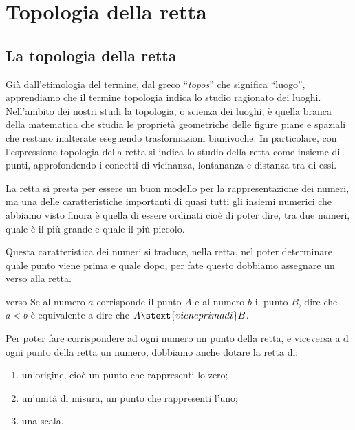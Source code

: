 


\chapter{Topologia della retta}

\section{La topologia della retta}
Già dall'etimologia del termine, dal greco ``\emph{topos}'' che significa 
``luogo'', apprendiamo che il termine topologia indica lo studio 
ragionato dei luoghi. 
Nell'ambito dei nostri studi la topologia, o scienza dei luoghi, 
è quella branca della matematica che studia le proprietà geometriche 
delle figure piane e spaziali che restano inalterate eseguendo 
trasformazioni biunivoche. 
In particolare, con l'espressione topologia della retta si indica 
lo studio della retta come insieme di punti, approfondendo i concetti di 
vicinanza, lontananza e distanza tra di essi.

La retta si presta per essere un buon modello per la rappresentazione dei 
numeri, ma una delle caratteristiche importanti di quasi tutti gli insiemi 
numerici che abbiamo visto finora è quella di essere ordinati cioè di poter 
dire, tra due numeri, quale è il più grande e quale il più piccolo.

Questa caratteristica dei numeri si traduce, nella retta, nel poter 
determinare quale punto viene prima e quale dopo, 
per fate questo dobbiamo assegnare un verso alla retta.


\begin{newdef}{}{verso}
Se al numero \(a\) corrisponde il punto \(A\) e al numero \(b\) il punto \(B\), 
dire che \(a < b\) è equivalente a dire che \(A \stext{viene prima di} B\).
\end{newdef}

Per poter fare corrispondere ad ogni numero un punto della retta, e viceversa a 
d ogni punto della retta un numero, dobbiamo anche dotare la retta di:
\begin{enumerate} [noitemsep]
\item un'origine, cioè un punto che rappresenti lo zero;
\item un'unità di misura, un punto che rappresenti l'uno;
\item una scala.
\end{enumerate}

